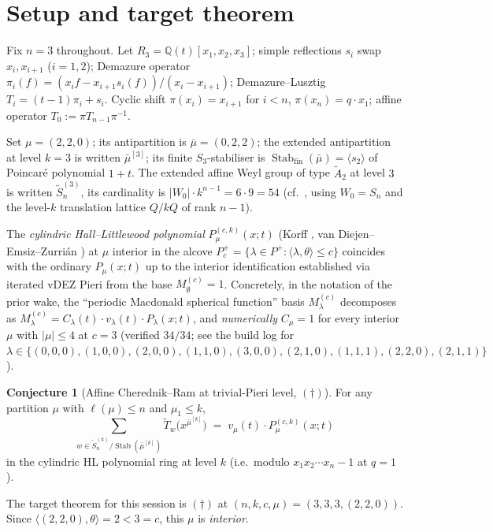 \documentclass[11pt]{article}
\theoremstyle{definition}
\newtheorem{conjecture}[theorem]{Conjecture}
\newcommand{\bmu}{\bar{\mu}}
\newcommand{\wt}[1]{\widetilde{#1}}
\newcommand{\Q}{\mathbb{Q}}
\newcommand{\afSn}{\wt{S}_n}
\newcommand{\Stab}{\operatorname{Stab}}
\newcommand{\dgg}{\dagger}
\begin{document}
\section{Setup and target theorem}
\label{sec:setup}

Fix $n = 3$ throughout. Let $R_3 = \Q(t)[x_1, x_2, x_3]$; simple reflections
$s_i$ swap $x_i, x_{i+1}$ ($i = 1, 2$); Demazure operator
$\pi_i(f) = (x_i f - x_{i+1} s_i(f))/(x_i - x_{i+1})$; Demazure--Lusztig
$T_i = (t-1)\pi_i + s_i$. Cyclic shift $\pi(x_i) = x_{i+1}$ for $i < n$,
$\pi(x_n) = q \cdot x_1$; affine operator $T_0 := \pi T_{n-1} \pi^{-1}$.

Set $\mu = (2, 2, 0)$; its antipartition is $\bmu = (0, 2, 2)$; the extended
antipartition at level $k=3$ is written $\bmu^{[3]}$; its finite $S_3$-stabiliser
is $\Stab_\text{fin}(\bmu) = \langle s_2\rangle$ of Poincar\'e polynomial
$1 + t$. The extended affine Weyl group of type $\wt A_2$ at level $3$ is
written $\afSn^{(3)}$, its cardinality is $|W_0| \cdot k^{n-1} = 6 \cdot 9 = 54$
(cf.\ \cite[\S 4]{Cherednik}, using $W_0 = S_n$ and the level-$k$
translation lattice $Q/kQ$ of rank $n - 1$).

The \emph{cylindric Hall--Littlewood polynomial}
$P^{(c,k)}_\mu(x; t)$ (Korff \cite{Korff2013}, van Diejen--Emsiz--Zurri\'an
\cite{vDEZ2021}) at $\mu$ interior in the alcove
$P_c^+ = \{\lambda \in P^+ : \langle \lambda, \theta \rangle \le c\}$
coincides with the ordinary $P_\mu(x; t)$ up to the interior identification
established via iterated vDEZ Pieri from the base $M^{(c)}_\emptyset = 1$.
Concretely, in the notation of the prior wake, the ``periodic Macdonald
spherical function'' basis $M^{(c)}_\lambda$ decomposes as
$M^{(c)}_\lambda = C_\lambda(t) \cdot v_\lambda(t) \cdot P_\lambda(x; t)$,
and \emph{numerically}
$C_\mu = 1$ for every interior $\mu$ with $|\mu| \le 4$ at $c = 3$
(verified $34/34$; see the build log for
$\lambda \in \{(0,0,0), (1,0,0), (2,0,0), (1,1,0), (3,0,0), (2,1,0),
(1,1,1), (2,2,0), (2,1,1)\}$).

\begin{conjecture}[Affine Cherednik--Ram at trivial-Pieri level, $(\dgg)$]
\label{conj:daggger}
For any partition $\mu$ with $\ell(\mu) \le n$ and $\mu_1 \le k$,
\[
\sum_{w \in \afSn^{(k)}/\Stab(\bmu^{[k]})}
   \wt T_w\bigl(x^{\bmu^{[k]}}\bigr)
   \;=\; v_\mu(t)\cdot P^{(c,k)}_\mu(x;t)
\]
in the cylindric HL polynomial ring at level $k$ (i.e.\ modulo
$x_1 x_2 \cdots x_n - 1$ at $q=1$).
\end{conjecture}

The target theorem for this session is $(\dgg)$ at $(n, k, c, \mu) =
(3, 3, 3, (2,2,0))$. Since $\langle (2,2,0), \theta \rangle = 2 < 3 = c$,
this $\mu$ is \emph{interior}.
\end{document}
